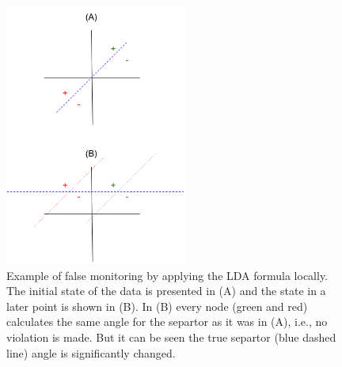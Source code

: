 \documentclass[11pt,twocolumn,varwidth=true,a4paper,fleqn]{article}
\begin{document}
\begin{figure}[h]
\centering
\includegraphics[width=60mm]{NegativeExample.png}
\caption{Example of false monitoring by applying the LDA formula locally. The
initial state of the data is presented in (A) and the state in a later point
is shown in (B). In (B) every node (green and red) calculates the same angle
for the separtor  as it was in (A), i.e., no violation is made. But it can be
seen the true separtor (blue dashed line) angle is significantly changed.}
\label{NegativeExampl}

\end{figure}
\end{document}
